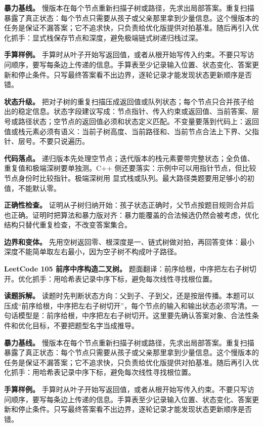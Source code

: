 \textbf{暴力基线。} 慢版本在每个节点重新扫描子树或路径，先求出局部答案。重复扫描暴露了真正状态：每个节点只需要从孩子或父亲那里拿到少量信息。这个慢版本的任务是保证不漏答案；它不追求快，只负责给优化版提供对拍基准。随后再引入优化抓手：显式栈保存节点和深度，避免极端链式树递归栈过深。

\textbf{手算样例。} 手算时从叶子开始写返回值，或者从根开始写传入约束。不要只写访问顺序，要写每条边上传递的信息。手算表至少记录输入位置、状态变化、答案更新和停止条件。只写最终答案看不出边界，逐轮记录才能发现状态更新顺序是否错。

\textbf{状态升级。} 把对子树的重复扫描压成返回值或队列状态；每个节点只合并孩子给出的稳定信息。状态字段建议写成：节点指针、传入约束或返回值、当前答案、层号或路径状态；空节点的返回值必须和状态定义匹配。不变量要落到代码上：返回值或栈元素必须有语义：当前子树高度、当前路径和、当前节点合法上下界、父指针、层号。不要只说遍历。

\textbf{代码落点。} 递归版本先处理空节点；迭代版本的栈元素要带完整状态；全负值、重复值和极端深树要单独测。C++ 侧还要落实：示例中可以用指针节点，但比较节点身份时比较指针。极端深树用  显式栈或队列。最大路径类题要用足够小的初值，不能默认零。

\textbf{正确性检查。} 证明从子树归纳开始：孩子状态正确时，父节点按题目规则合并后也正确。证明时把算法和暴力版对齐：暴力能覆盖的合法候选仍然会被考虑，优化结构只替代重复检查，不改变答案集合。

\textbf{边界和变体。} 先用空树返回零、根深度是一、链式树做对拍，再回答变体：最小深度不能简单取左右最小，因为空子树不构成叶子路径。

\noindent\textbf{LeetCode 105 前序中序构造二叉树。} 题面翻译：前序给根，中序把左右子树切开。优化抓手：用哈希表记录中序下标，避免每次线性寻找根位置。

\textbf{读题拆解。} 读题时先判断状态方向：父到子、子到父，还是按层传播。本题可以压成“前序给根，中序把左右子树切开”，每个节点的输入和输出状态必须写清。一句话模型是：前序给根，中序把左右子树切开。这里要先确认答案对象、合法性条件和优化目标，不要把题型名字当成推导。

\textbf{暴力基线。} 慢版本在每个节点重新扫描子树或路径，先求出局部答案。重复扫描暴露了真正状态：每个节点只需要从孩子或父亲那里拿到少量信息。这个慢版本的任务是保证不漏答案；它不追求快，只负责给优化版提供对拍基准。随后再引入优化抓手：用哈希表记录中序下标，避免每次线性寻找根位置。

\textbf{手算样例。} 手算时从叶子开始写返回值，或者从根开始写传入约束。不要只写访问顺序，要写每条边上传递的信息。手算表至少记录输入位置、状态变化、答案更新和停止条件。只写最终答案看不出边界，逐轮记录才能发现状态更新顺序是否错。

